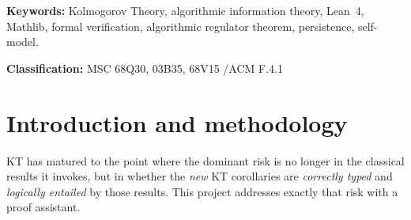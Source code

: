 \documentclass[11pt,a4paper]{article}
\newcommand{\lean}[1]{{\ttfamily\small
  \let\leanunderscore\_\def\_{\leanunderscore\allowbreak}#1}}
\begin{document}
\begin{abstract}
\noindent We are building \lean{KTAIT}, a Lean~4 + Mathlib formalization whose purpose is
narrow and load-bearing: to \emph{machine-check that the Kolmogorov-Theory (KT) corollaries
follow logically from an explicit algorithmic-information-theory (AIT) interface}, and that
the KT ontology is typed so that structural errors (e.g.\ comparing a whole pattern to its own
part) cannot silently compile. We do \emph{not} re-prove classical AIT: the standard AIT and
probability results (the invariance theorem, the coding theorem, symmetry of information,
Kraft's inequality, Bayes' rule, the Solomonoff--Levin universal semimeasure, the recursion
theorem, Rice's and Chaitin's theorems, and the Vereshchagin--Vitányi structure-function
results) are taken as a clearly delimited \emph{axiom layer}. Every \emph{KT} corollary is then
\emph{proved} from that layer with no \lean{sorry}, and a toy model witnesses that the axiom
layer is jointly satisfiable (so the corollaries are not vacuously true). The development has
since grown beyond that interface: it also checks finite and algebraic results that need no AIT
hypothesis, among them the operational algebra of computation (WP0004) and the exact and
approximate emulation and group-lifting results used for brain simulation (WP0215). This working
paper states the methodology, fixes the axiom layer, inventories every theorem/lemma across the KT
corpus with its current formalization status, and sets a prioritized roadmap.
\end{abstract}

\vspace{0.5em}
\noindent\textbf{Keywords:} Kolmogorov Theory, algorithmic information theory, Lean~4, Mathlib,
formal verification, algorithmic regulator theorem, persistence, self-model.

\noindent\textbf{Classification:} MSC 68Q30, 03B35, 68V15 \quad/\quad ACM F.4.1

\clearpage
\tableofcontents
\newpage

\section{Introduction and methodology}
\label{sec:intro}

KT has matured to the point where the dominant risk is no longer in the classical results it
invokes, but in whether the \emph{new} KT corollaries are \emph{correctly typed} and
\emph{logically entailed} by those results. This project addresses exactly that risk with a
proof assistant.\cite{leanmathlib}
\end{document}
